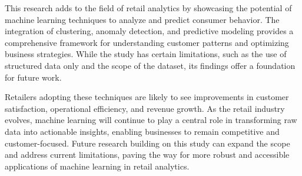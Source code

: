 \documentclass[12pt, a4paper,twoside]{report}
\theoremstyle{plain} %
\theoremstyle{definition} %
\theoremstyle{remark} %
\numberwithin{equation}{chapter}
\begin{document}
This research adds to the field of retail analytics by showcasing the potential of machine learning techniques to analyze and predict consumer behavior. The integration of clustering, anomaly detection, and predictive modeling provides a comprehensive framework for understanding customer patterns and optimizing business strategies. While the study has certain limitations, such as the use of structured data only and the scope of the dataset, its findings offer a foundation for future work.

Retailers adopting these techniques are likely to see improvements in customer satisfaction, operational efficiency, and revenue growth. As the retail industry evolves, machine learning will continue to play a central role in transforming raw data into actionable insights, enabling businesses to remain competitive and customer-focused. Future research building on this study can expand the scope and address current limitations, paving the way for more robust and accessible applications of machine learning in retail analytics.

\clearpage


\clearpage
\end{document}
